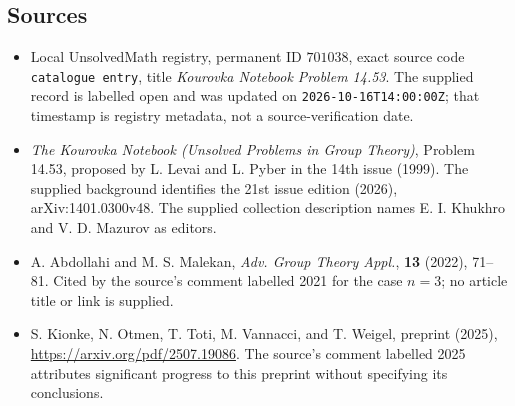 \documentclass[11pt]{article}
\begin{document}
\subsection{Sources}
\begin{itemize}
\item Local UnsolvedMath registry, permanent ID $701038$, exact source code \texttt{catalogue entry}, title \emph{Kourovka Notebook Problem 14.53}. The supplied record is labelled open and was updated on \texttt{2026-10-16T14:00:00Z}; that timestamp is registry metadata, not a source-verification date.
\item \emph{The Kourovka Notebook (Unsolved Problems in Group Theory)}, Problem 14.53, proposed by L. Levai and L. Pyber in the 14th issue (1999). The supplied background identifies the 21st issue edition (2026), arXiv:1401.0300v48. The supplied collection description names E. I. Khukhro and V. D. Mazurov as editors.
\item A. Abdollahi and M. S. Malekan, \emph{Adv. Group Theory Appl.}, \textbf{13} (2022), 71--81. Cited by the source's comment labelled 2021 for the case $n=3$; no article title or link is supplied.
\item S. Kionke, N. Otmen, T. Toti, M. Vannacci, and T. Weigel, preprint (2025), \url{https://arxiv.org/pdf/2507.19086}. The source's comment labelled 2025 attributes significant progress to this preprint without specifying its conclusions.
\end{itemize}
\end{document}
